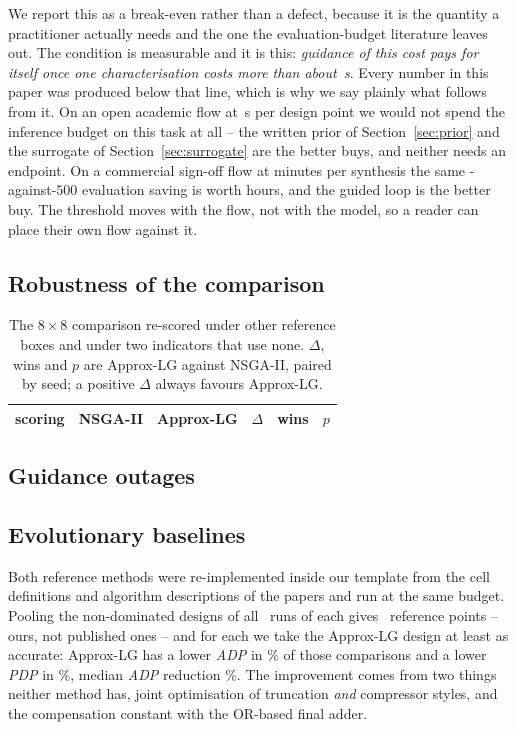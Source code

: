 \documentclass[acmsmall,review,anonymous]{acmart}
\newcommand{\adp}{\textit{ADP}}
\newcommand{\pdp}{\textit{PDP}}
\begin{document}
We report this as a break-even rather than a defect, because it is the quantity
a practitioner actually needs and the one the evaluation-budget literature
leaves out.  The condition is measurable and it is this: \emph{guidance of this
cost pays for itself once one characterisation costs more than about
\BreakEvenNSGA\,s}.  Every number in this paper was produced below that line,
which is why we say plainly what follows from it.  On an open academic flow at
\SecPerCircuitWide\,s per design point we would not spend the inference budget
on this task at all -- the written prior of Section~\ref{sec:prior} and the
surrogate of Section~\ref{sec:surrogate} are the better buys, and neither needs
an endpoint.  On a commercial sign-off flow at minutes per synthesis the same
\MatchNSGA-against-$500$ evaluation saving is worth hours, and the guided loop
is the better buy.  The threshold moves with the flow, not with the model, so a
reader can place their own flow against it.

\subsection{Robustness of the comparison}
\label{sec:robust}

\begin{table}[t]
\caption{The $8\times8$ comparison re-scored under other reference boxes and
under two indicators that use none.  $\Delta$, wins and $p$ are Approx-LG
against NSGA-II, paired by seed; a positive $\Delta$ always favours
Approx-LG.}
\label{tab:hvsens}
\centering\footnotesize
\setlength{\tabcolsep}{3pt}
\begin{tabular}{lccccc}
\toprule
scoring & NSGA-II & Approx-LG & $\Delta$ & wins & $p$\\
\midrule

\bottomrule
\end{tabular}
\end{table}

\RobustText

\subsection{Guidance outages}
\label{sec:failclosed}
\FailClosedText

\subsection{Evolutionary baselines}
\label{sec:evoref}
Both reference methods were re-implemented inside our template from the cell
definitions and algorithm descriptions of the papers and run at the same
budget.  Pooling the non-dominated designs of all \SeedsEight\ runs of each
gives \NrefEight\ reference points -- ours, not published ones -- and for each
we take the Approx-LG design at least as accurate: Approx-LG has a lower
\adp{} in \SotaEightADP\% of those comparisons and a lower \pdp{} in
\SotaEightPDP\%, median \adp{} reduction \MedianADPEight\%.  The improvement
comes from two things neither method has, joint optimisation of truncation
\emph{and} compressor styles, and the compensation constant with the OR-based
final adder.
\end{document}
